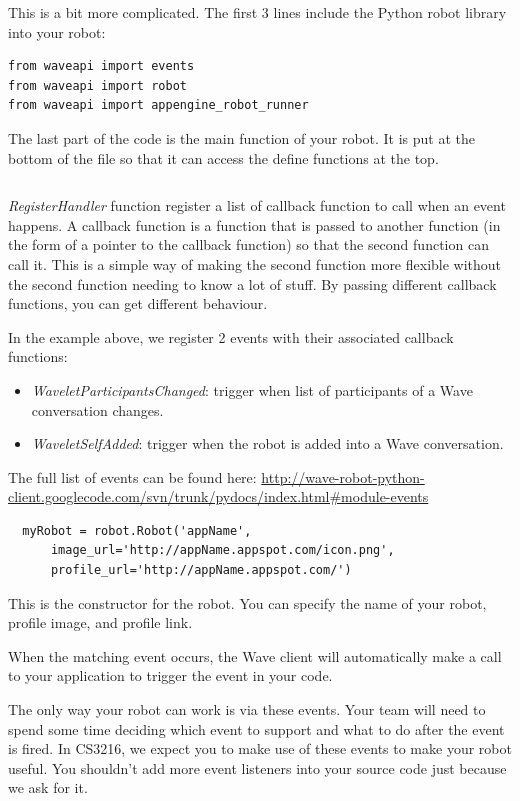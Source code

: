This is a bit more complicated. The first 3 lines include the Python
robot library into your robot:

\begin{verbatim}
from waveapi import events
from waveapi import robot
from waveapi import appengine_robot_runner
\end{verbatim}

The last part of the code is the main function of your robot. It is
put at the bottom of the file so that it can access the define
functions at the top.

\begin{verbatim}
\end{verbatim}

{\em RegisterHandler} function register a list of callback function to
call when an event happens. A callback function is a function that is
passed to another function (in the form of a pointer to the callback
function) so that the second function can call it. This is a simple
way of making the second function more flexible without the second
function needing to know a lot of stuff. By passing different callback
functions, you can get different behaviour.

In the example above, we register 2 events with their associated
callback functions:
\begin{itemize}
\item {\em WaveletParticipantsChanged}: trigger when list of participants of
a Wave conversation changes.
\item {\em WaveletSelfAdded}: trigger when the robot is added into a Wave 
conversation.
\end{itemize}

The full list of events can be found
here:
\url{http://wave-robot-python-client.googlecode.com/svn/trunk/pydocs/index.html#module-events}

\begin{verbatim}
  myRobot = robot.Robot('appName', 
      image_url='http://appName.appspot.com/icon.png',
      profile_url='http://appName.appspot.com/')
\end{verbatim}

This is the constructor for the robot. You can specify the name of
your robot, profile image, and profile link.

When the matching event occurs, the Wave client will automatically make a call 
to your application to trigger the event in your code.

The only way your robot can work is via these events. Your team will
need to spend some time deciding which event to support and what to do
after the event is fired. In CS3216, we expect you to make use of
these events to make your robot useful. You shouldn't add more event
listeners into your source code just because we ask for it.

